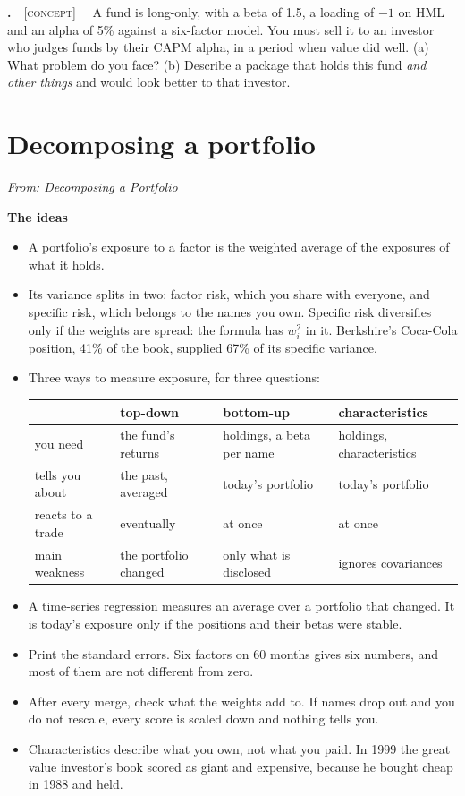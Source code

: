 \documentclass[11pt]{article}
\newcounter{ex}[section]
\renewcommand{\theex}{\thesection.\arabic{ex}}
\newenvironment{ex}[1][calculation]{\refstepcounter{ex}\par\medskip\textbf{\theex}\ \ {\small\textsc{[#1]}}\ \ }{\par}
\newcommand{\head}[1]{\par\medskip\textbf{#1}\par}
\begin{document}
\begin{ex}[concept]\label{ex:5.7}
A fund is long-only, with a beta of 1.5, a loading of $-1$ on HML and an alpha of 5\% against a six-factor model. You must
sell it to an investor who judges funds by their CAPM alpha, in a period when value did well. (a) What problem do you
face? (b) Describe a package that holds this fund \emph{and other things} and would look better to that investor.
\end{ex}

\section{Decomposing a portfolio}
{\small\emph{From: Decomposing a Portfolio}}

\head{The ideas}
\begin{itemize}
\item A portfolio's exposure to a factor is the weighted average of the exposures of what it holds.
\item Its variance splits in two: factor risk, which you share with everyone, and specific risk, which belongs to the
names you own. Specific risk diversifies only if the weights are spread: the formula has $w_{i}^{2}$ in it. Berkshire's
Coca-Cola position, 41\% of the book, supplied 67\% of its specific variance.
\item Three ways to measure exposure, for three questions:
\begin{center}
{\small\begin{tabular}{@{}llll@{}}
\toprule
 & top-down & bottom-up & characteristics \\
\midrule
you need & the fund's returns & holdings, a beta per name & holdings, characteristics \\
tells you about & the past, averaged & today's portfolio & today's portfolio \\
reacts to a trade & eventually & at once & at once \\
main weakness & the portfolio changed & only what is disclosed & ignores covariances \\
\bottomrule
\end{tabular}}
\end{center}
\item A time-series regression measures an average over a portfolio that changed. It is today's exposure only if the
positions and their betas were stable.
\item Print the standard errors. Six factors on 60 months gives six numbers, and most of them are not different from
zero.
\item After every merge, check what the weights add to. If names drop out and you do not rescale, every score is scaled
down and nothing tells you.
\item Characteristics describe what you own, not what you paid. In 1999 the great value investor's book scored as giant
and expensive, because he bought cheap in 1988 and held.
\end{itemize}
\end{document}
